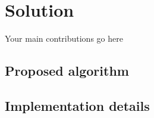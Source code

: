 \documentclass[../thesis.tex]{subfiles}
\begin{document}
    \chapter{Solution}

    Your main contributions go here

    \section{Proposed algorithm}

    \section{Implementation details}
\end{document}

